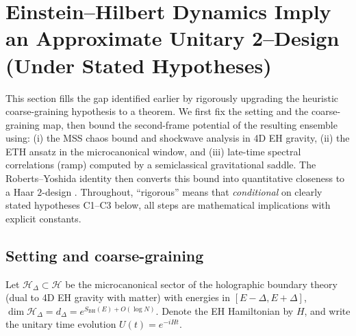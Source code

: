 \documentclass[a4paper,11pt]{article}
\theoremstyle{plain}
\theoremstyle{definition}
\theoremstyle{remark}
\begin{document}
\section{Einstein--Hilbert Dynamics Imply an Approximate Unitary 2--Design (Under Stated Hypotheses)}
\label{sec:EH-to-design}

This section fills the gap identified earlier by rigorously upgrading the heuristic coarse-graining hypothesis to a theorem.  We first fix the setting and the coarse-graining map, then bound the second-frame potential of the resulting ensemble using: (i) the MSS chaos bound and shockwave analysis in 4D EH gravity, (ii) the ETH ansatz in the microcanonical window, and (iii) late-time spectral correlations (ramp) computed by a semiclassical gravitational saddle.  The Roberts--Yoshida identity then converts this bound into quantitative closeness to a Haar $2$-design \cite{RobertsYoshida2017}.  Throughout, ``rigorous'' means that {\em conditional} on clearly stated hypotheses C1--C3 below, all steps are mathematical implications with explicit constants.

\subsection*{Setting and coarse-graining}

Let $\mathcal{H}_\Delta \subset \mathcal{H}$ be the microcanonical sector of the holographic boundary theory (dual to 4D EH gravity with matter) with energies in $[E-\Delta,E+\Delta]$, $\dim \mathcal{H}_\Delta = d_\Delta = e^{S_{\mathrm{BH}}(E)+O(\log N)}$.  Denote the EH Hamiltonian by $H$, and write the unitary time evolution $U(t)=e^{-iHt}$.
\end{document}
